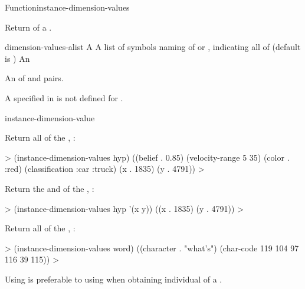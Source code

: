 \documentclass[10pt,twoside,english,pdftex]{article}
\begin{document}
\begin{functiondoc}{Function}{instance-dimension-values}%
  {
     
    \returns{} }
%
%

\fnsyntax

\fnpurpose Return  of a .

\fnpackage {}

\fnmodule {}

\fnargs
\begin{args}{dimension-values-alist}
 A 
 A list of symbols naming  of
   or , indicating all  of 
   (default is )
 An 
\end{args}

\fnreturns An  of  and
 pairs.

\fnerrors A  specified in  is not
defined for .

\begin{alsos}{instance-dimension-value}
\end{alsos}

\fnexamples
%
Return all  of the , :
%
\W\supp
\begin{example}
  > (instance-dimension-values hyp)
  ((belief . 0.85) (velocity-range 5 35) (color . :red)
   (classification :car :truck) (x . 1835) (y . 4791))
  >
\end{example}
%
Return the  and   of the
, :
%
\W\supp\notpretop
\begin{example}
  > (instance-dimension-values hyp '(x y))
  ((x . 1835) (y . 4791))
  >
\end{example}

Return all  of the , :
%
\W\supp
\begin{example}
  > (instance-dimension-values word)
  ((character . "what's") (char-code 119 104 97 116 39 115))
  >
\end{example}

\fnnote Using  is preferable
to using  when obtaining individual
 of a .

\end{functiondoc}
\end{document}

